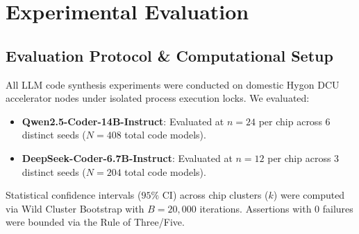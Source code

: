 \documentclass[conference]{IEEEtran}
\begin{document}
\section{Experimental Evaluation}

\subsection{Evaluation Protocol \& Computational Setup}
All LLM code synthesis experiments were conducted on domestic Hygon DCU accelerator nodes under isolated process execution locks. We evaluated:
\begin{itemize}
    \item \textbf{Qwen2.5-Coder-14B-Instruct}: Evaluated at $n=24$ per chip across 6 distinct seeds ($N=408$ total code models).
    \item \textbf{DeepSeek-Coder-6.7B-Instruct}: Evaluated at $n=12$ per chip across 3 distinct seeds ($N=204$ total code models).
\end{itemize}
Statistical confidence intervals ($95\%$ CI) across chip clusters ($k$) were computed via Wild Cluster Bootstrap with $B=20,000$ iterations. Assertions with 0 failures were bounded via the Rule of Three/Five.
\end{document}
